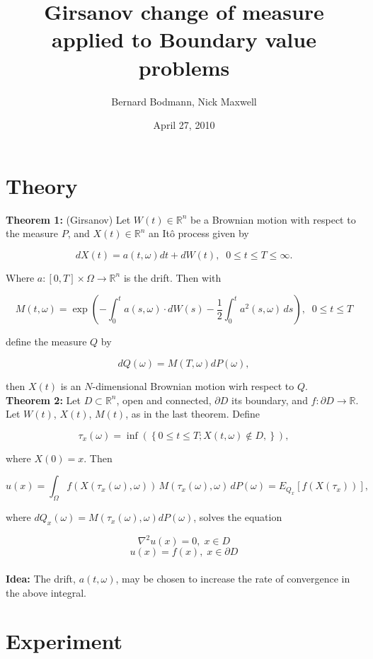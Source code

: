 \documentclass[12pt]{article}
\title{Girsanov change of measure applied to Boundary value problems}
\date{April 27, 2010}
\author{Bernard Bodmann, Nick Maxwell}
\newcommand{\reals}[0] { \mathbb{R}}
\newcommand{\om}[0] { \omega }
\newcommand{\Om}[0] { \Omega }
\newcommand{\rarw}[0] { \rightarrow }
\begin{document}
\maketitle

\section*{Theory}

{\bf Theorem 1:} (Girsanov) Let $W(t) \in \reals^n$ be a Brownian motion with respect to the measure $P$,  and $X(t) \in \reals^n$ an It\^o process given by 

$$
dX(t) = a(t,\om) dt + dW(t), \; \; 0 \le t \le T \le \infty.
$$

\noindent
Where $a:[0,T] \times \Om \rarw \reals^n$ is the drift. Then with

$$
M(t, \om ) = \exp \left( - \int_0^t a(s,\om) \cdot dW(s) - \frac{1}{2} \int_0^t a^2(s,\om) \, ds  \right), \; \; 0 \le t \le T
$$

\noindent
define the measure $Q$ by 

$$
dQ(\om) = M(T, \om) dP(\om),
$$

\noindent
then $X(t)$ is an $N$-dimensional Brownian motion wirh respect to $Q$. \\



{\bf Theorem 2:} Let $D \subset \reals^n$, open and connected, $\partial D$ its boundary, and $f: \partial D \rarw \reals$. Let $W(t)$, $X(t)$, $M(t)$, as in the last theorem. Define

$$
\tau_{x}(\om) = \inf \left( \left\{  0 \le t \le T;  X(t, \om) \not \in D,  \right\} \right),
$$

\noindent
where $X(0) = x$. Then

$$
u(x) = \int_\Om f ( X(\tau_x(\om), \om) ) \, M(\tau_x(\om), \om) \,  dP(\om) = E_{Q_x} [ f(X(\tau_x)) ],
$$

\noindent
where $dQ_x(\om) = M(\tau_x(\om), \om) dP(\om)$, solves the equation 

$$
\nabla^2 u(x) = 0, \; x \in D
$$
$$
u(x) = f(x), \; x \in \partial D
$$\\

{\bf Idea:}
The drift, $a(t,\om)$, may be chosen to increase the rate of convergence in the above integral.


\section*{Experiment}
\end{document}
